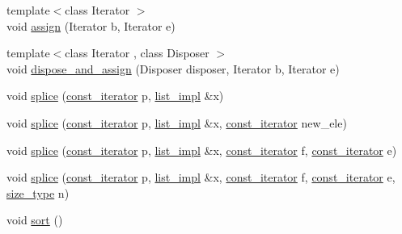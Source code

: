 \begin{DoxyCompactItemize}
{\footnotesize template$<$class Iterator $>$ }\\void \hyperlink{classboost_1_1intrusive_1_1list__impl_a9d29df1112a14488065cf678e4c1484a}{assign} (Iterator b, Iterator e)
\item 
{\footnotesize template$<$class Iterator , class Disposer $>$ }\\void \hyperlink{classboost_1_1intrusive_1_1list__impl_a00ddf26d859cd22fdb3b2355e8af1cd8}{dispose\+\_\+and\+\_\+assign} (Disposer disposer, Iterator b, Iterator e)
\item 
void \hyperlink{classboost_1_1intrusive_1_1list__impl_a458f433ae6990732b006544cb26f3cf2}{splice} (\hyperlink{classboost_1_1intrusive_1_1list__impl_af4ced710fe02662c5650d161af83d8cd}{const\+\_\+iterator} p, \hyperlink{classboost_1_1intrusive_1_1list__impl}{list\+\_\+impl} \&x)
\item 
void \hyperlink{classboost_1_1intrusive_1_1list__impl_a7d78b95611893de6779df06307a7ccb0}{splice} (\hyperlink{classboost_1_1intrusive_1_1list__impl_af4ced710fe02662c5650d161af83d8cd}{const\+\_\+iterator} p, \hyperlink{classboost_1_1intrusive_1_1list__impl}{list\+\_\+impl} \&x, \hyperlink{classboost_1_1intrusive_1_1list__impl_af4ced710fe02662c5650d161af83d8cd}{const\+\_\+iterator} new\+\_\+ele)
\item 
void \hyperlink{classboost_1_1intrusive_1_1list__impl_aca408f75788b574272d29392aebef9a5}{splice} (\hyperlink{classboost_1_1intrusive_1_1list__impl_af4ced710fe02662c5650d161af83d8cd}{const\+\_\+iterator} p, \hyperlink{classboost_1_1intrusive_1_1list__impl}{list\+\_\+impl} \&x, \hyperlink{classboost_1_1intrusive_1_1list__impl_af4ced710fe02662c5650d161af83d8cd}{const\+\_\+iterator} f, \hyperlink{classboost_1_1intrusive_1_1list__impl_af4ced710fe02662c5650d161af83d8cd}{const\+\_\+iterator} e)
\item 
void \hyperlink{classboost_1_1intrusive_1_1list__impl_a561eb714c3b33ed907e4a0aaed234592}{splice} (\hyperlink{classboost_1_1intrusive_1_1list__impl_af4ced710fe02662c5650d161af83d8cd}{const\+\_\+iterator} p, \hyperlink{classboost_1_1intrusive_1_1list__impl}{list\+\_\+impl} \&x, \hyperlink{classboost_1_1intrusive_1_1list__impl_af4ced710fe02662c5650d161af83d8cd}{const\+\_\+iterator} f, \hyperlink{classboost_1_1intrusive_1_1list__impl_af4ced710fe02662c5650d161af83d8cd}{const\+\_\+iterator} e, \hyperlink{classboost_1_1intrusive_1_1list__impl_a3e340b93081e392fba09de7145fb5733}{size\+\_\+type} n)
\item 
void \hyperlink{classboost_1_1intrusive_1_1list__impl_abc510cb71270fe4ee9e5f8c7ba8e3aa0}{sort} ()

\end{DoxyCompactItemize}
